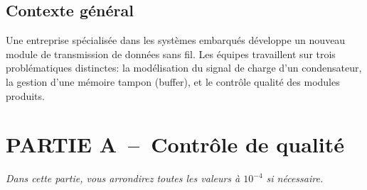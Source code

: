 
\pagestyle{DS_FP}

\bigskip


\subsection*{Contexte général}

Une entreprise spécialisée dans les systèmes embarqués développe un nouveau module de transmission de données sans fil. Les équipes travaillent sur trois problématiques distinctes: la modélisation du signal de charge d'un condensateur, la gestion d'une mémoire tampon (buffer), et le contrôle qualité des modules produits.

\section*{PARTIE A~--~Contrôle de qualité}

\medskip

\emph{Dans cette partie, vous arrondirez toutes les valeurs à $10^{-4}$ si nécessaire.}

\medskip

